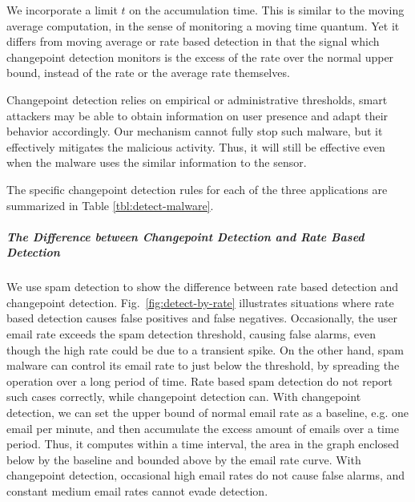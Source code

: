 We incorporate a limit $t$ on the accumulation time.  This is similar to the
moving average computation, in the sense of monitoring a moving time quantum.
Yet it differs from moving average or rate based detection in that the signal
which changepoint detection monitors is the excess of the rate over the normal
upper bound, instead of the rate or the average rate themselves.

Changepoint detection relies on empirical or administrative
thresholds, smart attackers may be able to obtain information on user presence
and adapt their behavior accordingly. Our mechanism cannot fully
stop such malware, but it effectively mitigates the malicious activity.
Thus, it will still be effective even when the malware uses the 
similar information to the sensor.

The specific changepoint detection rules for each of the three applications
are summarized in Table \ref{tbl:detect-malware}. 

\subparagraph{The Difference between Changepoint Detection and 
Rate Based Detection}

We use spam detection to show the difference between rate based
detection and changepoint detection. Fig.~\ref{fig:detect-by-rate}
illustrates situations where rate based detection causes false
positives and false negatives. Occasionally, the user email rate
exceeds the spam detection threshold, causing false alarms, even
though the high rate could be due to a transient spike. 
On the other hand, spam malware
can control its email rate to just below the threshold, by spreading
the operation over a long period of time. Rate based spam detection
do not report such cases correctly, while changepoint detection can.
With changepoint detection, we can set the upper bound of normal
email rate as a baseline, e.g. one email per minute, and then accumulate
the excess amount of emails over a time period. Thus, it computes
within a time interval, the area in the graph enclosed below by the
baseline and bounded above by the email rate curve. With changepoint
detection, occasional high email rates do not cause false alarms,
and constant medium email rates cannot evade detection. 
